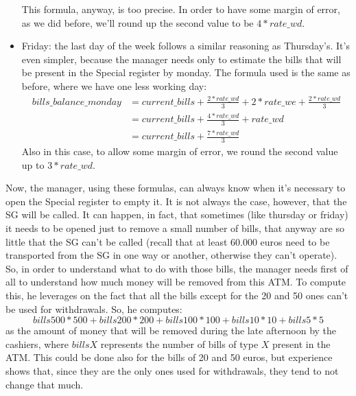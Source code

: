 \documentclass{article}
\begin{document}
\begin{itemize}
    This formula, anyway, is too precise. In order to have some margin of error, as we did before, we'll round up the second value to be $4*rate\_wd$. %
    \item Friday: the last day of the week follows a similar reasoning as Thursday's. It's even simpler, because the manager needs only to estimate the bills that will be present in the Special register by monday. The formula used is the same as before, where we have one less working day:
    \begin{equation*}
        \begin{aligned}
        bills\_balance\_monday 
        & = current\_bills + \frac{2 * rate\_wd}{3} + 2 * rate\_we + \frac{2* rate\_wd}{3}\\
        & = current\_bills + \frac{4*rate\_wd}{3} + rate\_wd\\
        & = current\_bills + \frac{7*rate\_wd}{3}
        \end{aligned}
    \end{equation*}
    Also in this case, to allow some margin of error, we round the second value up to $3*rate\_wd$.
\end{itemize}
Now, the manager, using these formulas, can always know when it's necessary to open the Special register to empty it. It is not always the case, however, that the SG will be called. It can happen, in fact, that sometimes (like thursday or friday) it needs to be opened just to remove a small number of bills, that anyway are so little that the SG can't be called (recall that at least 60.000 euros need to be transported from the SG in one way or another, otherwise they can't operate). So, in order to understand what to do with those bills, the manager needs first of all to understand how much money will be removed from this ATM. To compute this, he leverages on the fact that all the bills except for the 20 and 50 ones can't be used for withdrawals. So, he computes:
\begin{equation*}
    bills500 * 500 + bills200 * 200 + bills100 * 100 + bills10 * 10 + bills5 * 5
\end{equation*}
as the amount of money that will be removed during the late afternoon by the cashiers, where $billsX$ represents the number of bills of type $X$ present in the ATM. This could be done also for the bills of 20 and 50 euros, but experience shows that, since they are the only ones used for withdrawals, they tend to not change that much.
\end{document}
